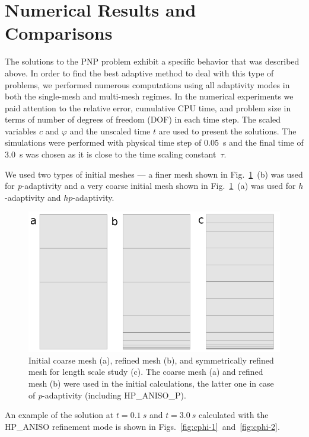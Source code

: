 \section{Numerical Results and Comparisons}\label{sec:results}


The solutions to the PNP problem exhibit a specific behavior that was 
described above. In order to find the best adaptive method to deal with 
this type of problems, we performed numerous computations using all 
adaptivity modes in both the single-mesh and multi-mesh regimes.
In the numerical experiments we paid attention to the 
relative error, cumulative CPU time, and problem size 
in terms of number of degrees of freedom (DOF) in each 
time step. The scaled variables $c$
and $\varphi$ and the unscaled time $t$ are used to present the solutions.
The simulations were performed with physical time step of $0.05$~s and
the final time of $3.0$~s was chosen as it is close to the time
scaling constant~$\tau$.

We used two types of initial meshes --- a finer mesh shown 
in Fig.~\ref{fig:mesh}~(b) was used for \emph{p}-adaptivity
and a very coarse initial mesh shown in  Fig.~\ref{fig:mesh}~(a) was 
used for $h$-adaptivity and $hp$-adaptivity.

\begin{figure}[!ht]
  \begin{centering}
  \includegraphics[width=.9\columnwidth]{mesh}
  \caption{\label{fig:mesh} Initial coarse mesh (a),
  	refined mesh (b), and symmetrically refined mesh for length scale study (c). 
	The coarse mesh (a)
	and refined mesh (b) were used in the initial calculations, the latter one
	in case of \emph{p}-adaptivity (including HP\_ANISO\_P).}
  \end{centering}
\end{figure}

An example of the solution at $t=0.1\ s$ and $t=3.0\ s$ 
calculated with the HP\_ANISO refinement mode is shown
in Figs.~\ref{fig:cphi-1}~and~\ref{fig:cphi-2}. 

